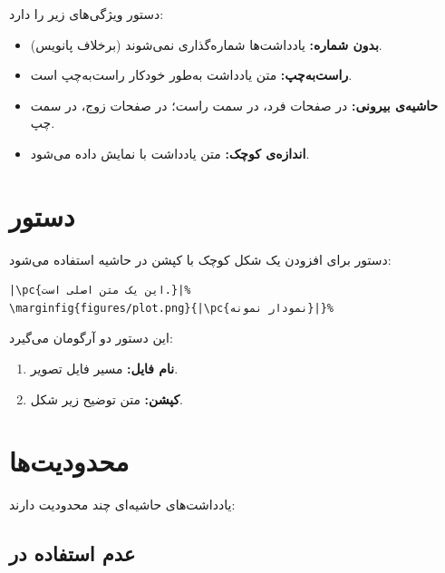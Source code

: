دستور  ویژگی‌های زیر را دارد:

\begin{itemize}
    \item \textbf{بدون شماره:} یادداشت‌ها
    شماره‌گذاری نمی‌شوند (برخلاف پانویس).
    \item \textbf{راست‌به‌چپ:} متن یادداشت
    به‌طور خودکار راست‌به‌چپ است.
    \item \textbf{حاشیه‌ی بیرونی:} در صفحات فرد،
    در سمت راست؛ در صفحات زوج، در سمت چپ.
    \item \textbf{اندازه‌ی کوچک:} متن یادداشت با
     نمایش داده می‌شود.
\end{itemize}


\section{دستور }
\label{sec:margin-notes-marginfig}

دستور  برای افزودن یک شکل کوچک
با کپشن در حاشیه استفاده می‌شود:

\begin{latin}
\begin{verbatim}
|\pc{این یک متن اصلی است.}|%
\marginfig{figures/plot.png}{|\pc{نمودار نمونه}|}%
\end{verbatim}
\end{latin}

این دستور دو آرگومان می‌گیرد:

\begin{enumerate}
    \item \textbf{نام فایل:} مسیر فایل تصویر.
    \item \textbf{کپشن:} متن توضیح زیر شکل.
\end{enumerate}


\section{محدودیت‌ها}
\label{sec:margin-notes-limitations}

یادداشت‌های حاشیه‌ای چند محدودیت دارند:

\subsection{عدم استفاده در }
\label{sec:margin-notes-limitation-tcolorbox}

